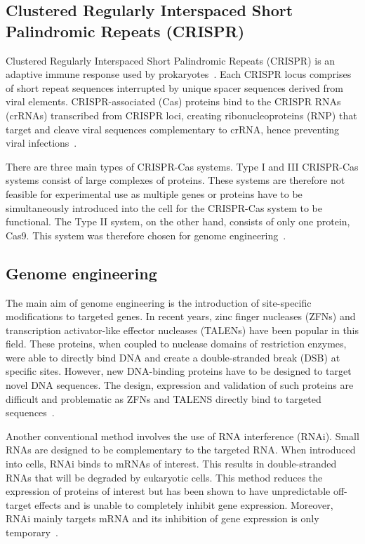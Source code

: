 \documentclass[11pt]{article}
\begin{document}
\subsection{Clustered Regularly Interspaced Short Palindromic Repeats (CRISPR)}
Clustered Regularly Interspaced Short Palindromic Repeats (CRISPR) is an adaptive immune response used by prokaryotes~\citep{Sorek2013}.  Each CRISPR locus comprises of short repeat sequences interrupted by unique spacer sequences derived from viral elements. CRISPR-associated (Cas) proteins bind to the CRISPR RNAs (crRNAs) transcribed from CRISPR loci, creating ribonucleoproteins (RNP) that target and cleave viral sequences complementary to crRNA, hence preventing viral infections~\citep{Jiang2015, Sternberg2015}. 

There are three main types of CRISPR-Cas systems. Type I and III CRISPR-Cas systems consist of large complexes of proteins. These systems are therefore not feasible for experimental use as multiple genes or proteins have to be simultaneously introduced into the cell for the CRISPR-Cas system to be functional. The Type II system, on the other hand, consists of only one protein, Cas9. This system was therefore chosen for genome engineering~\citep{Doudna2014, Jinek2012a}.

\subsection{Genome engineering}
The main aim of genome engineering is the introduction of site-specific modifications to targeted genes. In recent years, zinc finger nucleases (ZFNs) and transcription activator-like effector nucleases (TALENs) have been popular in this field. These proteins, when coupled to nuclease domains of restriction enzymes, were able to directly bind DNA and create a double-stranded break (DSB) at specific sites. However, new DNA-binding proteins have to be designed to target novel DNA sequences. The design, expression and validation of such proteins are difficult and problematic as ZFNs and TALENS directly bind to targeted sequences~\citep{Doudna2014}.

Another conventional method involves the use of RNA interference (RNAi). Small RNAs are designed to be complementary to the targeted RNA. When introduced into cells, RNAi binds to mRNAs of interest. This results in double-stranded RNAs that will be degraded by eukaryotic cells. This method reduces the expression of proteins of interest but has been shown to have unpredictable off-target effects and is unable to completely inhibit gene expression. Moreover, RNAi mainly targets mRNA and its inhibition of gene expression is only temporary~\citep{Gilles2014a}.
\end{document}
